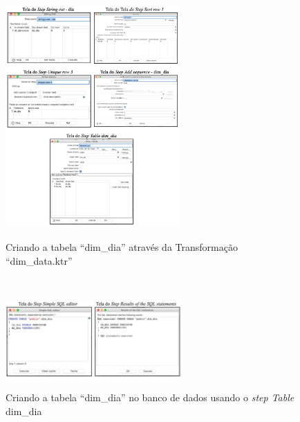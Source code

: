 \begin{figure}[H]
	\vspace*{0,2cm}
    \centering
    \caption{Criando a tabela ``dim\_dia'' atrav\'{e}s da Transforma\c{c}\~{a}o ``dim\_data.ktr''}
    \includegraphics[width=0.6\textwidth]{./04-figuras/figura-dim-dia}
    \label{fig:ilustfigdimdia}
\end{figure}
\vspace*{-0,9cm}
{\raggedright {}} \\

\begin{figure}[H]
	\vspace*{0,2cm}
    \centering
    \caption{Criando a tabela ``dim\_dia'' no banco de dados usando o \textit{step Table} dim\_dia}
    \includegraphics[width=0.6\textwidth]{./04-figuras/figura-tb-dim-dia}
    \label{fig:ilustfigtbdimdia}
\end{figure}
\vspace*{-0,9cm}
{\raggedright {}} \\

